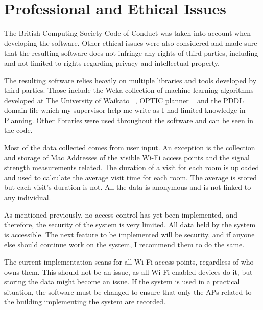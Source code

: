 \chapter{Professional and Ethical Issues}
The British Computing Society Code of Conduct was taken into account when developing the software. Other ethical issues were also considered and made sure that the resulting software does not infringe any rights of third parties, including and not limited to rights regarding privacy and intellectual property. 

The resulting software relies heavily on multiple libraries and tools developed by third parties. Those include the Weka collection of machine learning algorithms developed at The University of Waikato ~\cite{Weka}, OPTIC planner ~\cite{OPTIC} and the PDDL domain file which my supervisor help me write as I had limited knowledge in Planning. Other libraries were used throughout the software and can be seen in the code. 

Most of the data collected comes from user input. An exception is the collection and storage of Mac Addresses of the visible Wi-Fi access points and the signal strength measurements related. The duration of a visit for each room is uploaded and used to calculate the average visit time for each room. The average is stored but each visit's duration is not. All the data is anonymous and is not linked to any individual. 

As mentioned previously, no access control has yet been implemented, and therefore, the security of the system is very limited. All data held by the system is accessible. The next feature to be implemented will be security, and if anyone else should continue work on the system, I recommend them to do the same.

The current implementation scans for all Wi-Fi access points, regardless of who owns them. This should not be an issue, as all Wi-Fi enabled devices do it, but storing the data might become an issue. If the system is used in a practical situation, the software must be changed to ensure that only the APs related to the building implementing the system are recorded.

  